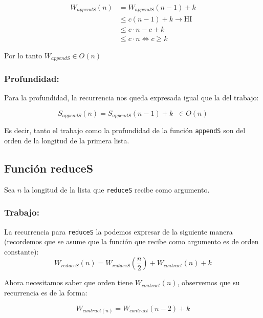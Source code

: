 \documentclass[11pt]{article}
\begin{document}
\begin{align*}
    W_{appendS}(n) & = W_{appendS}(n - 1) + k \\
             & \leq c(n - 1) + k \rightarrow \text{HI}\\
             & \leq c \cdot n - c + k \\
             & \leq c \cdot n \iff c \geq k
\end{align*}

Por lo tanto $W_{appendS} \in O(n)$ \\

\subsubsection{Profundidad:}

Para la profundidad, la recurrencia nos queda expresada igual que la del
trabajo:

\begin{equation*}
    S_{appendS}(n) = S_{appendS}(n - 1) + k \; \; \in O(n)
\end{equation*}

Es decir, tanto el trabajo como la profundidad de la función \texttt{appendS}
son del orden de la longitud de la primera lista.


\subsection{Función reduceS}
Sea $n$ la longitud de la lista que \texttt{reduceS} recibe como argumento.
\subsubsection{Trabajo:}

La recurrencia para \texttt{reduceS} la podemos expresar de la siguiente manera
(recordemos que se asume que la función que recibe como argumento es de orden constante):
\begin{equation*}
    W_{reduceS}(n) = W_{reduceS}(\frac{n}{2}) + W_{contract}(n) + k
\end{equation*}

Ahora necesitamos saber que orden tiene $W_{contract}(n)$, observemos que su 
recurrencia es de la forma:

\begin{equation*}
    W_{contract(n)} = W_{contract}(n-2) + k 
\end{equation*}
\end{document}
